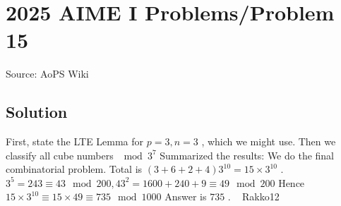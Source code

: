 \documentclass[12pt]{article}
\begin{document}
\section*{{2025 AIME I Problems/Problem 15}}
Source: AoPS Wiki

\subsection*{Solution}
First, state the LTE Lemma for $p = 3, n = 3$ , which we might use. Then we classify all cube numbers $\mod{3^7}$ Summarized the results: We do the final combinatorial problem. Total is $(3+6+2+4)3^{10}=15\times 3^{10}$ . $3^5 = 243 \equiv 43 \mod{200},43^2=1600+240+9\equiv49\mod{200}$ Hence $15\times3^{10}\equiv15\times49\equiv735\mod{1000}$ Answer is $\boxed{735}$ . ~ Rakko12
\end{document}
